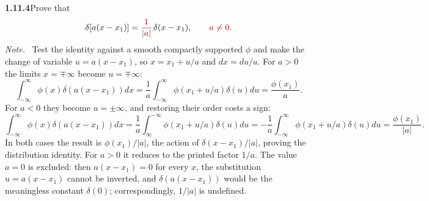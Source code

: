 \par\bigskip
\noindent\textbf{1.11.4}\quad Prove that
\[
\delta[a(x-x_{1})]=\erratum{\frac{1}{|a|}}\,\delta(x-x_{1}),\qquad \erratum{a\ne0}.
\]
\emph{Note.}~
\solution
{}
Test the identity against a smooth compactly supported $\phi$ and
make the change of variable $u=a(x-x_1)$, so $x=x_1+u/a$ and
$dx=du/a$. For $a>0$ the limits $x=\mp\infty$ become $u=\mp\infty$:
\[
 \int_{-\infty}^{\infty}\phi(x)\delta(a(x-x_1))dx
 =\frac1a\int_{-\infty}^{\infty}\phi(x_1+u/a)\delta(u)du
 =\frac{\phi(x_1)}a.
\]
For $a<0$ they become $u=\pm\infty$, and restoring their order costs a
sign:
\[
 \int_{-\infty}^{\infty}\phi(x)\delta(a(x-x_1))dx
 =\frac1a\int_{\infty}^{-\infty}\phi(x_1+u/a)\delta(u)du
 =-\frac1a\int_{-\infty}^{\infty}\phi(x_1+u/a)\delta(u)du
 =\frac{\phi(x_1)}{|a|}.
\]
In both cases the result is $\phi(x_1)/|a|$, the action of
$\delta(x-x_1)/|a|$, proving the distribution identity. For $a>0$ it
reduces to the printed factor $1/a$.
The value $a=0$ is excluded: then $a(x-x_1)=0$ for every $x$, the
substitution $u=a(x-x_1)$ cannot be inverted, and $\delta(a(x-x_1))$
would be the meaningless constant $\delta(0)$; correspondingly, $1/|a|$
is undefined.


